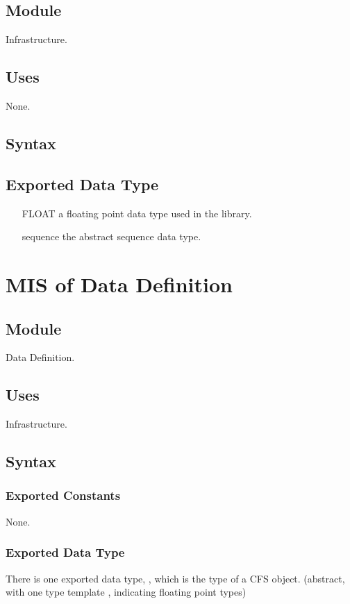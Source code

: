 \documentclass[12pt, titlepage]{article}
\begin{document}
\subsection{Module}

Infrastructure.

\subsection{Uses}

None.
\subsection{Syntax}
\subsection{Exported Data Type}
\begin{itemize}
	\item[FLOAT] a floating point data type used in the library.
	\item [sequence] the abstract sequence data type.
\end{itemize}

\section{MIS of Data Definition} \label{MIS:DataDef}
\subsection{Module}

Data Definition.

\subsection{Uses}

Infrastructure.

\subsection{Syntax}

\subsubsection{Exported Constants}
None.
\subsubsection{Exported Data Type}
There is one exported data type, , which is the type of a CFS
object. (abstract, with one type template , indicating floating point
types)
\end{document}
